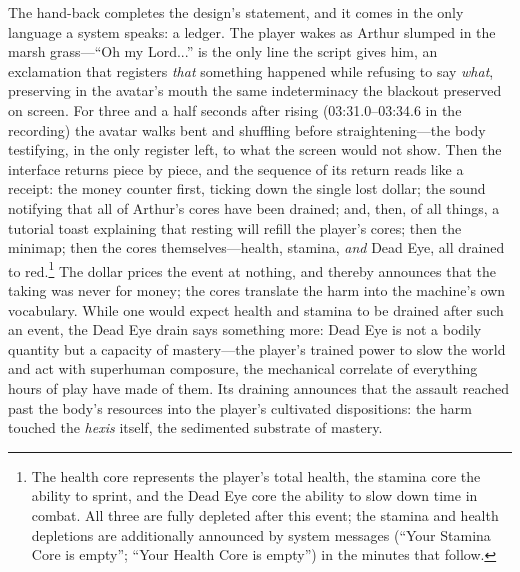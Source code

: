 \documentclass{article}
\begin{document}
The hand-back completes the design's statement, and it comes in the only language a system speaks: a ledger. The player wakes as Arthur slumped in the marsh grass---``Oh my Lord...'' is the only line the script gives him, an exclamation that registers \textit{that} something happened while refusing to say \textit{what}, preserving in the avatar's mouth the same indeterminacy the blackout preserved on screen. For three and a half seconds after rising (03:31.0--03:34.6 in the recording) the avatar walks bent and shuffling before straightening---the body testifying, in the only register left, to what the screen would not show. Then the interface returns piece by piece, and the sequence of its return reads like a receipt: the money counter first, ticking down the single lost dollar; the sound notifying that all of Arthur's cores have been drained; and, then, of all things, a tutorial toast explaining that resting will refill the player's cores; then the minimap; then the cores themselves---health, stamina, \textit{and} Dead Eye, all drained to red.\footnote{The health core represents the player's total health, the stamina core the ability to sprint, and the Dead Eye core the ability to slow down time in combat. All three are fully depleted after this event; the stamina and health depletions are additionally announced by system messages (``Your Stamina Core is empty''; ``Your Health Core is empty'') in the minutes that follow.} The dollar prices the event at nothing, and thereby announces that the taking was never for money; the cores translate the harm into the machine's own vocabulary. While one would expect health and stamina to be drained after such an event, the Dead Eye drain says something more: Dead Eye is not a bodily quantity but a capacity of mastery---the player's trained power to slow the world and act with superhuman composure, the mechanical correlate of everything hours of play have made of them. Its draining announces that the assault reached past the body's resources into the player's cultivated dispositions: the harm touched the \textit{hexis} itself, the sedimented substrate of mastery.
\end{document}
